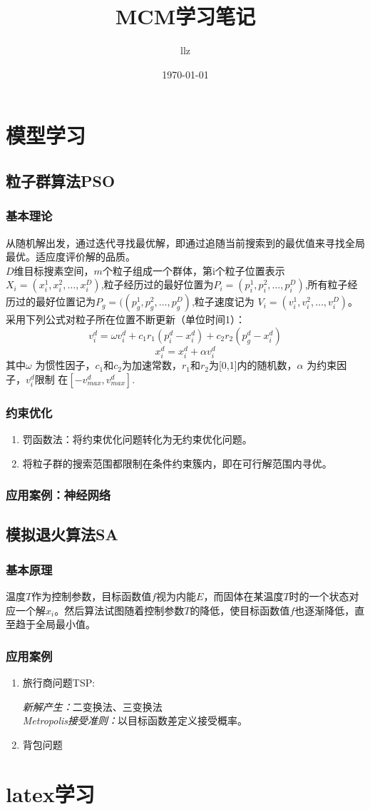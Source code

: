 \documentclass[12pt,a4paper]{article}
\title{MCM学习笔记}
\author{llz}
\date{\today}
\begin{document}
\kaishu
\maketitle

\section{模型学习}

\subsection{粒子群算法PSO}
\subsubsection{基本理论}
从随机解出发，通过迭代寻找最优解，即通过追随当前搜索到的最优值来寻找全局最优。适应度评价解的品质。\\
\indent$D$维目标搜素空间，$m$个粒子组成一个群体，第i个粒子位置表示$X_i=(x_i^1,x_i^2,\dots,x_i^D)$,粒子经历过的最好位置为$P_i=(p_i^1,p_i^2,\dots,p_i^D)$,所有粒子经历过的最好位置记为$P_g=((p_g^1,p_g^2,\dots,p_g^D)$,粒子速度记为
$V_i=(v_i^1,v_i^2,\dots,v_i^D)$。采用下列公式对粒子所在位置不断更新（单位时间1）：
$$v_i^d=\omega v^d_i+c_1r_1(p^d_i-x^d_i)+c_2r_2(p^d_g-x^d_i)$$
$$x^d_i=x^d_i+\alpha v^d_i$$
其中$\omega$ 为惯性因子，$c_1$和$c_2$为加速常数，$r_1$和$r_2$为[0,1]内的随机数，$\alpha$ 为约束因子，$v^d_i$限制
在$[-v^d_{max},v^d_{max}]$.
\subsubsection{约束优化}
\begin{enumerate}
\item 罚函数法：将约束优化问题转化为无约束优化问题。
\item 将粒子群的搜索范围都限制在条件约束簇内，即在可行解范围内寻优。
\end{enumerate}
\subsubsection{应用案例：神经网络}

\subsection{模拟退火算法SA}
\subsubsection{基本原理}
温度$T$作为控制参数，目标函数值$f$视为内能$E$，而固体在某温度$T$时的一个状态对应一个解$x_i$。然后算法试图随着控制参数$T$的降低，使目标函数值$f$也逐渐降低，直至趋于全局最小值。
\subsubsection{应用案例}
\begin{enumerate}
\item{旅行商问题TSP:}
\begin{center}
\emph{新解产生：}二变换法、三变换法\\
\emph{Metropolis接受准则：}以目标函数差定义接受概率。
\end{center}
\item{背包问题}
\end{enumerate}

\section{latex学习}
\end{document}
